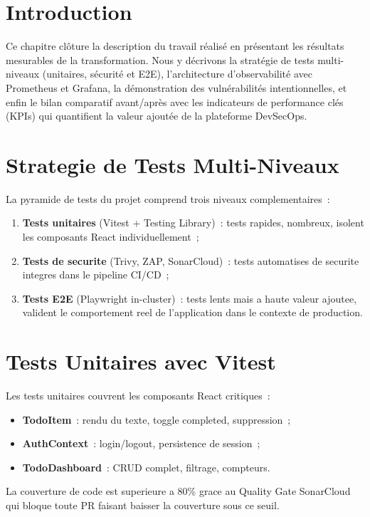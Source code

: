 ﻿%

\section*{Introduction}

Ce chapitre clôture la description du travail réalisé en présentant les résultats mesurables
de la transformation. Nous y décrivons la stratégie de tests multi-niveaux (unitaires, sécurité
et E2E), l'architecture d'observabilité avec Prometheus et Grafana, la démonstration des
vulnérabilités intentionnelles, et enfin le bilan comparatif avant/après avec les indicateurs
de performance clés (KPIs) qui quantifient la valeur ajoutée de la plateforme DevSecOps.

\section{Strategie de Tests Multi-Niveaux}
La pyramide de tests du projet comprend trois niveaux complementaires~:
\begin{enumerate}
  \item \textbf{Tests unitaires} (Vitest + Testing Library)~: tests rapides, nombreux,
        isolent les composants React individuellement~;
  \item \textbf{Tests de securite} (Trivy, ZAP, SonarCloud)~: tests automatises de securite
        integres dans le pipeline CI/CD~;
  \item \textbf{Tests E2E} (Playwright in-cluster)~: tests lents mais a haute valeur ajoutee,
        valident le comportement reel de l'application dans le contexte de production.
\end{enumerate}
\section{Tests Unitaires avec Vitest}
Les tests unitaires couvrent les composants React critiques~:
\begin{itemize}
  \item \textbf{TodoItem}~: rendu du texte, toggle completed, suppression~;
  \item \textbf{AuthContext}~: login/logout, persistence de session~;
  \item \textbf{TodoDashboard}~: CRUD complet, filtrage, compteurs.
\end{itemize}
La couverture de code est superieure a 80\% grace au Quality Gate SonarCloud qui bloque
toute PR faisant baisser la couverture sous ce seuil.

